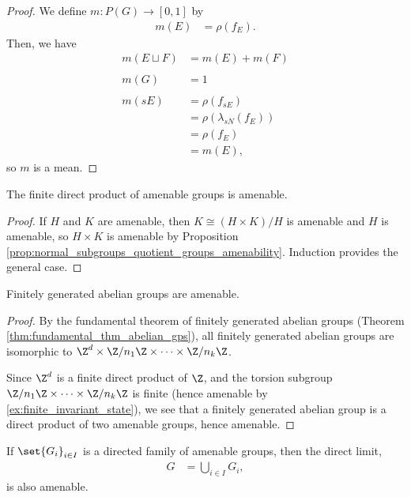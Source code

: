 \begin{proof}
  We define $m\colon P(G)\rightarrow [0,1]$ by
  \begin{align*}
    m(E) &= \rho\left(f_E\right).
  \end{align*}
  Then, we have
  \begin{align*}
    m\left(E\sqcup F\right) &= m(E) + m(F)\\
                            \\
    m\left(G\right) &= 1\\
    \\
    m\left(sE\right) &= \rho\left(f_{sE}\right)\\
                     &= \rho\left(\lambda_{sN}\left(f_{E}\right)\right)\\
                     &= \rho\left(f_E\right)\\
                     &= m(E),
  \end{align*}
  so $m$ is a mean.
\end{proof}
\begin{corollary}
  The finite direct product of amenable groups is amenable.
\end{corollary}
\begin{proof}
  If $H$ and $K$ are amenable, then $K\cong \left(H\times K\right)/H$ is amenable and $H$ is amenable, so $H\times K$ is amenable by Proposition \ref{prop:normal_subgroups_quotient_groups_amenability}. Induction provides the general case.
\end{proof}
\begin{corollary}\label{cor:finitely_generated_amenable}
  Finitely generated abelian groups are amenable.
\end{corollary}
\begin{proof}
  By the fundamental theorem of finitely generated abelian groups (Theorem \ref{thm:fundamental_thm_abelian_gps}), all finitely generated abelian groups are isomorphic to $\Z^{d}\times \Z/n_1\Z\times\cdots\times \Z/{n_k}\Z$.\newline

  Since $\Z^{d}$ is a finite direct product of $\Z$, and the torsion subgroup $\Z/n_1\Z\times\cdots\times \Z/n_k\Z$ is finite (hence amenable by \ref{ex:finite_invariant_state}), we see that a finitely generated abelian group is a direct product of two amenable groups, hence amenable.
\end{proof}
\begin{corollary}\label{cor:direct_limit_amenable}
  If $\set{G_i}_{i\in I}$ is a directed family of amenable groups, then the direct limit,
  \begin{align*}
    G &= \bigcup_{i\in I}G_i,
  \end{align*}
  is also amenable.
\end{corollary}
